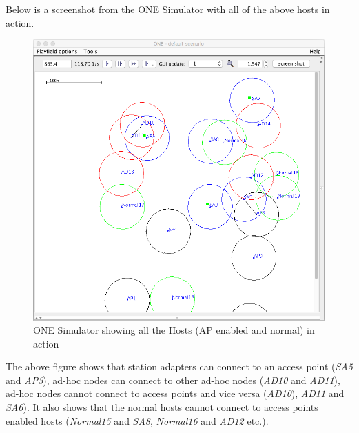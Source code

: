 	\newpage
	Below is a screenshot from the ONE Simulator with all of the above hosts in action.\newline
	\begin{figure}[H]
		\centering
		\includegraphics[scale=0.5]{./figures/aps-2}
		\caption{ONE Simulator showing all the Hosts (AP enabled and normal) in action}
	\end{figure}
	The above figure shows that station adapters can connect to an access point (\textit{SA5} and \textit{AP3}), ad-hoc nodes can connect to other ad-hoc nodes (\textit{AD10} and \textit{AD11}), ad-hoc nodes cannot connect to access points and vice versa (\textit{AD10}), \textit{AD11} and \textit{SA6}). It also shows that the normal hosts cannot connect to access points enabled hosts (\textit{Normal15} and \textit{SA8}, \textit{Normal16} and \textit{AD12} etc.).

\newpage
